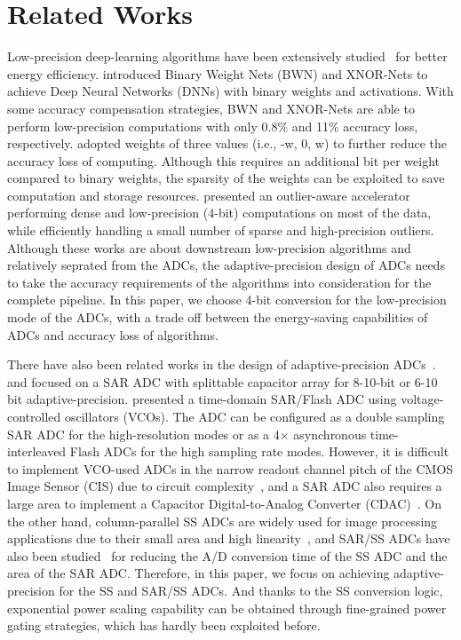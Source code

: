 \section{Related Works}\label{related}

Low-precision deep-learning algorithms have been extensively studied~\cite{leibe_xnor-net_2016,li_ternary_2016,park_energy-efficient_2018} for better energy efficiency. 
\cite{leibe_xnor-net_2016} introduced Binary Weight Nets (BWN) and XNOR-Nets to achieve
Deep Neural Networks (DNNs) with binary weights and activations. 
With some accuracy compensation strategies, BWN and XNOR-Nets are able to perform low-precision computations with only 0.8\% and 11\% accuracy loss, respectively.
\cite{li_ternary_2016} adopted weights of three values (i.e., -w, 0, w) to further reduce the accuracy loss of computing. Although this requires an additional bit per weight compared to binary weights, the sparsity of the weights can be exploited to save computation and storage resources.
\cite{park_energy-efficient_2018} presented an outlier-aware accelerator performing dense and low-precision (4-bit) computations on most of the data, while efficiently handling a small number of sparse and high-precision outliers.
Although these works are about downstream low-precision algorithms and relatively seprated from the ADCs, the adaptive-precision design of ADCs needs to take the accuracy requirements of the algorithms into consideration for the complete pipeline. In this paper, we choose 4-bit conversion for the low-precision mode of the ADCs, with a trade off between the energy-saving capabilities of ADCs and accuracy loss of algorithms.

There have also been related works in the design of adaptive-precision ADCs~\cite{zhu_06_2013,zhu_6--10-bit_2015,el-halwagy_100-mss5-gss_2018}. 
\cite{zhu_06_2013} and \cite{zhu_6--10-bit_2015} focused on a SAR ADC with splittable capacitor array for 8-10-bit or 6-10 bit adaptive-precision. 
\cite{el-halwagy_100-mss5-gss_2018} presented a time-domain SAR/Flash ADC using voltage-controlled oscillators (VCOs). The ADC can be configured as a double sampling SAR ADC for the high-resolution modes or as a 4× asynchronous time-interleaved Flash ADCs for the high sampling rate modes.
However, it is difficult to implement VCO-used ADCs in the narrow readout channel pitch of the CMOS Image Sensor (CIS) due to circuit complexity~\cite{kim_area-efficient_2016}, and a SAR ADC also requires a large area to implement a Capacitor Digital-to-Analog Converter (CDAC)~\cite{funatsu_62_2015}.
On the other hand, column-parallel SS ADCs are widely used for image processing applications due to their small area and high linearity~\cite{kim_11-bit_2021,nie_single_2020,kumagai_14-inch_2018,park_640_2020}, and SAR/SS ADCs have also been studied~\cite{kim_area-efficient_2016,chen_12_2014} for reducing the A/D conversion time of the SS ADC and the area of the SAR ADC.     
Therefore, in this paper, we focus on achieving adaptive-precision for the SS and SAR/SS ADCs. And thanks to the SS conversion logic, exponential power scaling capability can be obtained through fine-grained power gating strategies, which has hardly been exploited before.

